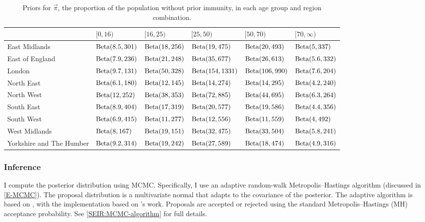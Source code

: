 \documentclass[thesis.tex]{subfiles}
\begin{document}
\begin{landscape}
\begin{table}
\centering
\begin{tabular}{l|lllll}
         & $[0,16)$ & $[16,25)$ & $[25,50)$ & $[50,70)$ & $[70,\infty)$ \\
        \hline
        East Midlands & $\operatorname{Beta}(8.5, 301)$ & $\operatorname{Beta}(18, 256)$ & $\operatorname{Beta}(19, 475)$ & $\operatorname{Beta}(20, 493)$ & $\operatorname{Beta}(5, 337)$ \\
        East of England & $\operatorname{Beta}(7.9, 236)$ & $\operatorname{Beta}(21, 248)$ & $\operatorname{Beta}(35, 677)$ & $\operatorname{Beta}(26, 613)$ & $\operatorname{Beta}(5.6, 332)$ \\
        London & $\operatorname{Beta}(9.7, 131)$ & $\operatorname{Beta}(50, 328)$ & $\operatorname{Beta}(154, 1331)$ & $\operatorname{Beta}(106, 990)$ & $\operatorname{Beta}(7.6, 204)$ \\
        North East & $\operatorname{Beta}(6.1, 180)$ & $\operatorname{Beta}(12, 145)$ & $\operatorname{Beta}(14, 274)$ & $\operatorname{Beta}(14, 295)$ & $\operatorname{Beta}(4.2, 240)$ \\
        North West & $\operatorname{Beta}(12, 252)$ & $\operatorname{Beta}(38, 353)$ & $\operatorname{Beta}(72, 885)$ & $\operatorname{Beta}(44, 695)$ & $\operatorname{Beta}(6.3, 264)$ \\
        South East & $\operatorname{Beta}(8.9, 404)$ & $\operatorname{Beta}(17, 319)$ & $\operatorname{Beta}(20, 577)$ & $\operatorname{Beta}(19, 586)$ & $\operatorname{Beta}(4.4, 356)$ \\
        South West & $\operatorname{Beta}(6.9, 415)$ & $\operatorname{Beta}(11, 277)$ & $\operatorname{Beta}(12, 556)$ & $\operatorname{Beta}(11, 559)$ & $\operatorname{Beta}(4, 492)$ \\
        West Midlands & $\operatorname{Beta}(8, 167)$ & $\operatorname{Beta}(19, 151)$ & $\operatorname{Beta}(32, 475)$ & $\operatorname{Beta}(33, 504)$ & $\operatorname{Beta}(5.8, 241)$ \\
        Yorkshire and The Humber & $\operatorname{Beta}(9.2, 314)$ & $\operatorname{Beta}(19, 242)$ & $\operatorname{Beta}(27, 589)$ & $\operatorname{Beta}(18, 474)$ & $\operatorname{Beta}(4.9, 316)$ \\
    \end{tabular}
\caption{Priors for $\vec{\pi}$, the proportion of the population without prior immunity, in each age group and region combination.}
\label{SEIR:table:immunity-prior}
\end{table}
\end{landscape}

\subsubsection{Inference} \label{SEIR:sec:inference}

I compute the posterior distribution using MCMC.
Specifically, I use an adaptive random-walk Metropolis--Hastings algorithm (discussed in \cref{E-MCMC}).
The proposal distribution is a multivariate normal that adapts to the covariance of the posterior.
The adaptive algorithm is based on \textcite[algorithm 4]{andrieuTutorial}, with the implementation based on \textcite{ghoshApproximate}'s work.
Proposals are accepted or rejected using the standard Metropolis--Hastings (MH) acceptance probability.
See \cref{SEIR:MCMC-algorithm} for full details.
\end{document}
